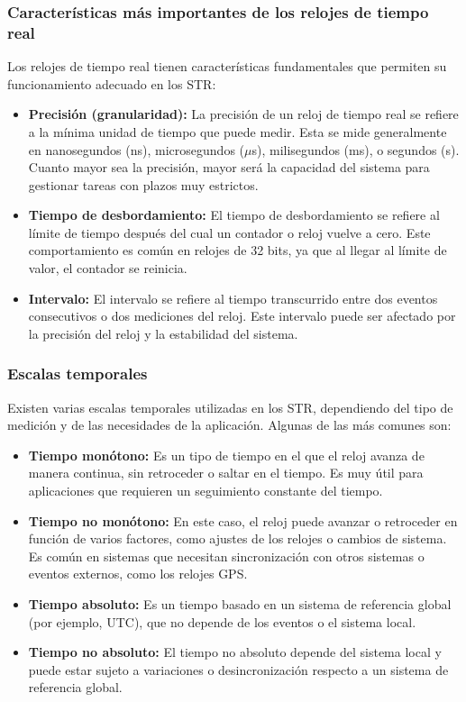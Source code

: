 \documentclass[a4paper,12pt]{article}
\begin{document}
\subsubsection{Características más importantes de los relojes de tiempo real}

Los relojes de tiempo real tienen características fundamentales que permiten su funcionamiento adecuado en los STR:

\begin{itemize}
    \item \textbf{Precisión (granularidad):} La precisión de un reloj de tiempo real se refiere a la mínima unidad de tiempo que puede medir. Esta se mide generalmente en nanosegundos (ns), microsegundos (\(\mu\)s), milisegundos (ms), o segundos (s). Cuanto mayor sea la precisión, mayor será la capacidad del sistema para gestionar tareas con plazos muy estrictos.
    
    \item \textbf{Tiempo de desbordamiento:} El tiempo de desbordamiento se refiere al límite de tiempo después del cual un contador o reloj vuelve a cero. Este comportamiento es común en relojes de 32 bits, ya que al llegar al límite de valor, el contador se reinicia.
    
    \item \textbf{Intervalo:} El intervalo se refiere al tiempo transcurrido entre dos eventos consecutivos o dos mediciones del reloj. Este intervalo puede ser afectado por la precisión del reloj y la estabilidad del sistema.
\end{itemize}

\subsubsection{Escalas temporales}
Existen varias escalas temporales utilizadas en los STR, dependiendo del tipo de medición y de las necesidades de la aplicación. Algunas de las más comunes son:

\begin{itemize}
    \item \textbf{Tiempo monótono:} Es un tipo de tiempo en el que el reloj avanza de manera continua, sin retroceder o saltar en el tiempo. Es muy útil para aplicaciones que requieren un seguimiento constante del tiempo.
    
    \item \textbf{Tiempo no monótono:} En este caso, el reloj puede avanzar o retroceder en función de varios factores, como ajustes de los relojes o cambios de sistema. Es común en sistemas que necesitan sincronización con otros sistemas o eventos externos, como los relojes GPS.
    
    \item \textbf{Tiempo absoluto:} Es un tiempo basado en un sistema de referencia global (por ejemplo, UTC), que no depende de los eventos o el sistema local.
    
    \item \textbf{Tiempo no absoluto:} El tiempo no absoluto depende del sistema local y puede estar sujeto a variaciones o desincronización respecto a un sistema de referencia global.
\end{itemize}
\end{document}
